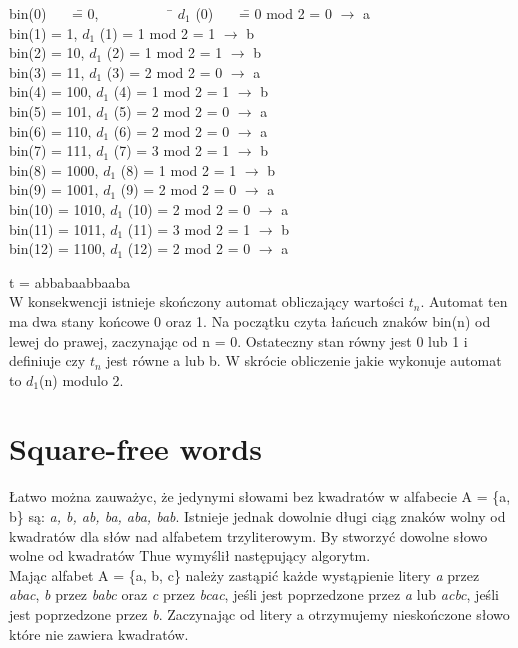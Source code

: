 \documentclass[document]{xmgr}
\begin{document}
\begin{tabbing}
bin(0)~~~ \= = 0,~~~~~~~~~~ \= $d_1$ (0)~~~ \= = 0 mod 2 = 0 $\to$ a \\
bin(1) \> = 1, \> $d_1$ (1) \> = 1 mod 2 = 1 $\to$ b\\
bin(2) \> = 10, \> $d_1$ (2) \> = 1 mod 2 = 1 $\to$ b\\
bin(3) \> = 11, \> $d_1$ (3) \> 	= 2 mod 2 = 0 $\to$ a\\
bin(4) \> = 100, \> $d_1$ (4) \> = 1 mod 2 = 1 $\to$ b\\
bin(5) \> = 101, \> $d_1$ (5) \> 	= 2 mod 2 = 0 $\to$ a\\
bin(6) \> = 110, \> $d_1$ (6) \> = 2 mod 2 = 0 $\to$ a\\
bin(7) \> = 111, \> $d_1$ (7) \> = 3 mod 2 = 1 $\to$ b\\
bin(8) \> = 1000, \> $d_1$ (8) \> = 1 mod 2 = 1 $\to$ b\\
bin(9) \> = 1001, \> $d_1$ (9) \> = 2 mod 2 = 0 $\to$ a\\
bin(10) \> = 1010,	\> $d_1$ (10) \> = 2 mod 2 = 0 $\to$ a\\
bin(11) \> = 1011, 	\> $d_1$ (11) \> = 3 mod 2 = 1 $\to$ b\\
bin(12) \> = 1100, 	\> $d_1$ (12) \> = 2 mod 2 = 0 $\to$ a
\end{tabbing}

\noindent t = abbabaabbaaba\\

W konsekwencji istnieje skończony automat obliczający wartości $t_n$. Automat ten ma dwa stany końcowe 0 oraz 1. Na początku czyta łańcuch znaków bin(n) od lewej do prawej, zaczynając od n = 0. Ostateczny stan równy jest 0 lub 1 i definiuje czy $t_n$ jest równe a lub b. W skrócie obliczenie jakie wykonuje automat to $d_1$(n) modulo 2.


\section{Square-free words}
Łatwo można zauważyc, że jedynymi słowami bez kwadratów w alfabecie A = \{a, b\} są: \emph{a, b, ab, ba, aba, bab}. Istnieje jednak dowolnie długi ciąg znaków wolny od kwadratów dla słów nad alfabetem trzyliterowym. By stworzyć dowolne słowo wolne od kwadratów Thue wymyślił następujący algorytm.\\
Mając alfabet A = \{a, b, c\} należy zastąpić każde wystąpienie litery \emph{a} przez \emph{abac},  \emph{b} przez \emph{babc} oraz \emph{c} przez \emph{bcac}, jeśli jest poprzedzone przez \emph{a} lub \emph{acbc}, jeśli jest poprzedzone przez \emph{b}. Zaczynając od litery a otrzymujemy nieskończone słowo które nie zawiera kwadratów.\\
\end{document}
